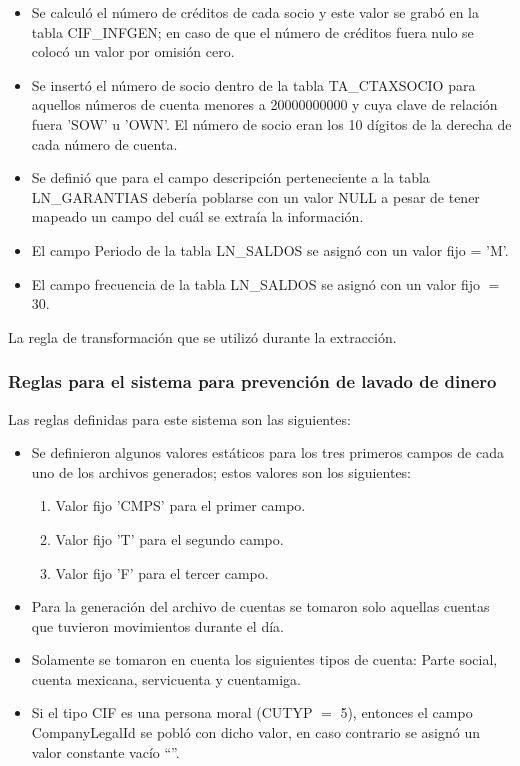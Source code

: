 \begin{itemize}
\item Se calculó el número de créditos de cada socio y este valor se grabó en
  la tabla CIF\_INFGEN; en caso de que el número de créditos fuera nulo se
  colocó un valor por omisión cero.

\item Se insertó el número de socio dentro de la tabla TA\_CTAXSOCIO para
  aquellos números de cuenta menores a 20000000000 y cuya clave de relación
  fuera 'SOW' u 'OWN'. El número de socio eran los 10 dígitos de la derecha de
  cada número de cuenta.

\item Se definió que para el campo descripción perteneciente a la tabla
  LN\_GARANTIAS debería poblarse con un valor NULL a pesar de tener mapeado un
  campo del cuál se extraía la información.

\item El campo Periodo de la tabla LN\_SALDOS se asignó con un valor fijo =
  'M'.

\item El campo frecuencia de la tabla LN\_SALDOS se asignó con un valor fijo
  $=$ 30.

\end{itemize}

La regla de transformación que se utilizó durante la extracción.

\subsubsection{Reglas para el sistema para prevención de lavado de dinero}

Las reglas definidas para este sistema son las siguientes:

\begin{itemize}
\item Se definieron algunos valores estáticos para los tres primeros campos de
  cada uno de los archivos generados; estos valores son los siguientes:
\begin{enumerate}
\item Valor fijo 'CMPS' para el primer campo.
\item Valor fijo 'T' para el segundo campo.
\item Valor fijo 'F' para el tercer campo.
\end{enumerate}
\item Para la generación del archivo de cuentas se tomaron solo aquellas
  cuentas que tuvieron movimientos durante el día.
\item Solamente se tomaron en cuenta los siguientes tipos de cuenta: Parte
  social, cuenta mexicana, servicuenta y cuentamiga.
\item Si el tipo CIF es una persona moral (CUTYP $=$ 5), entonces el campo
  CompanyLegalId se pobló con dicho valor, en caso contrario se asignó un valor
  constante vacío ``''.
\end{itemize}

